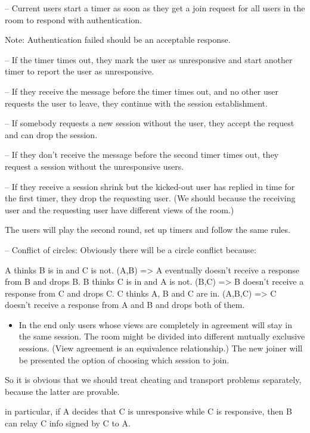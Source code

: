 \documentclass[11pt]{article}
\begin{document}
-- Current users start a timer as soon as they get a join request for
all users in the room to respond with authentication.

Note: Authentication failed should be an acceptable response.

-- If the timer times out, they mark the user as unresponsive and start
another timer to report the user as unresponsive.

-- If they receive the message before the timer times out,
   and no other user requests the user to leave, they continue with
   the session establishment.

-- If somebody requests a new session without the user, they accept
   the request and can drop the session.

-- If they don't receive the message before the second timer times
   out, they request a session without the unresponsive users.

-- If they receive a session shrink but the kicked-out user
   has replied in time for the first timer, they drop the requesting
   user. (We should because the receiving user and the requesting user have different views of the room.)

The users will play the second round, set up timers and follow the same
rules.

-- Conflict of circles:
   Obviously there will be a circle conflict because:

A thinks B is in and C is not. (A,B) => A eventually doesn't receive a response from B and drops B.
B thinks C is in and A is not. (B,C) =>  B doesn't receive a response from C and drops C.
C thinks A, B and C are in. (A,B,C) => C doesn't receive a response from A and B and drops both of them.

\begin{itemize}
\item In the end only users whose views are completely in agreement will stay in the same session. The room might be
divided into different mutually exclusive sessions. (View agreement is an equivalence relationship.)
The new joiner will be presented the option of choosing which session to join.
\end{itemize}

So it is obvious that we should treat cheating and transport problems separately, because the latter are provable.

in particular, if A decides that C is unresponsive while C is responsive, then B can relay C info signed by C to A.
\end{document}
